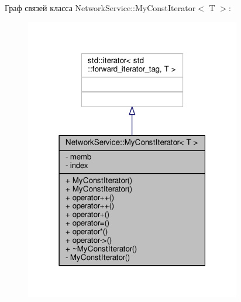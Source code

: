 Граф связей класса Network\+Service\+:\+:My\+Const\+Iterator$<$ T $>$\+:\nopagebreak
\begin{figure}[H]
\begin{center}
\leavevmode
\includegraphics[width=267pt]{class_network_service_1_1_my_const_iterator__coll__graph}
\end{center}
\end{figure}
